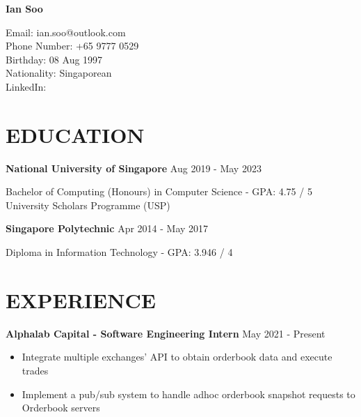 \documentclass[11pt]{article} %
\begin{document}

{\LARGE\bfseries Ian Soo} %

Email: ian.soo@outlook.com\\
Phone Number: +65 9777 0529\\
Birthday: 08 Aug 1997\\
Nationality: Singaporean\\
LinkedIn: \href{https://www.linkedin.com/in/sooian/}{\color{black}{https://www.linkedin.com/in/sooian/}}


\section*{EDUCATION}

\textbf{National University of Singapore} \hfill Aug 2019 - May 2023

Bachelor of Computing (Honours) in Computer Science - GPA: 4.75 / 5\\
University Scholars Programme (USP)

\medskip

\textbf{Singapore Polytechnic} \hfill Apr 2014 - May 2017

Diploma in Information Technology - GPA: 3.946 / 4


\section*{EXPERIENCE}

\textbf{Alphalab Capital - Software Engineering Intern} \hfill May 2021 - Present

\smallskip
\begin{itemize}

    \item Integrate multiple exchanges' API to obtain orderbook data and execute trades
    \item Implement a pub/sub system to handle adhoc orderbook snapshot requests to Orderbook servers

\end{itemize}
\end{document}

